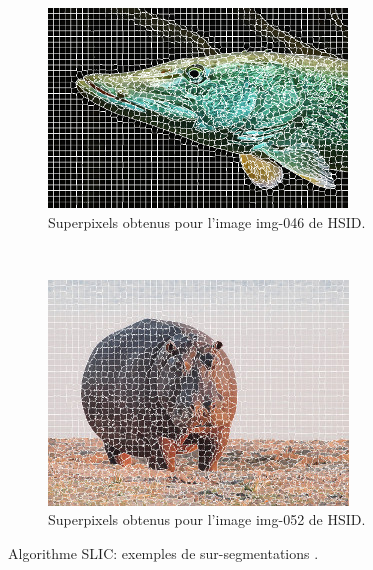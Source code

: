  
  \begin{figure}[htb]
	\centering
	 \begin{subfigure}[t]{0.45\textwidth}	
			\includegraphics[width=\textwidth]{images/sur-segmentation/SLIC/EX1-img-046}
		 	\caption{Superpixels obtenus pour l'image img-046 de HSID.}
	\end{subfigure}
 ~
	 \begin{subfigure}[t]{0.45\textwidth}	
			\includegraphics[width=\textwidth]{images/sur-segmentation/SLIC/EX2-img-052}
		 	\caption{Superpixels obtenus pour l'image img-052 de HSID.}
	\end{subfigure}
	\caption{Algorithme SLIC: exemples de sur-segmentations .}
	\label{fig:sp:exslic1}
\end{figure}


